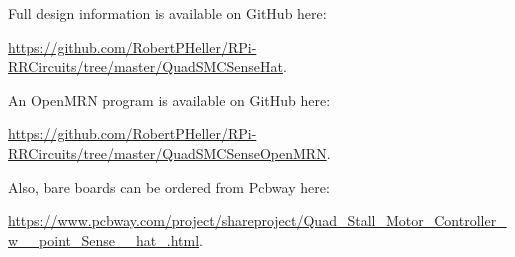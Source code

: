 Full design information is available on GitHub here:                           
 
\url{https://github.com/RobertPHeller/RPi-RRCircuits/tree/master/QuadSMCSenseHat}.

An OpenMRN program is available on GitHub here:

\url{https://github.com/RobertPHeller/RPi-RRCircuits/tree/master/QuadSMCSenseOpenMRN}.

Also, bare boards can be ordered from Pcbway here:

\url{https://www.pcbway.com/project/shareproject/Quad_Stall_Motor_Controller_w__point_Sense__hat_.html}.




